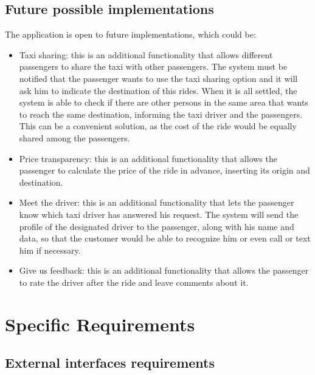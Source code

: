 \documentclass[18pt,oneside,a4paper, titlepage]{article}
\begin{document}
		\subsection{Future possible implementations}
			The application is open to future implementations, which could be:
			\begin{itemize}
				\item Taxi sharing: this is an additional functionality that allows different passengers to share the taxi with other passengers. The system must be notified that the passenger wants to use the taxi sharing option and it will ask him to indicate the destination of this rides. When it is all settled, the system is able to check if there are other persons in the same area that wants to reach the same destination, informing the taxi driver and the passengers. This can be a convenient solution, as the cost of the ride would be equally shared among the passengers.
				\item Price transparency: this is an additional functionality that allows the passenger to calculate the price of the ride in advance, inserting its origin and destination.
				\item Meet the driver: this is an additional functionality that lets the passenger know which taxi driver has answered his request. The system will send the profile of the designated driver to the passenger, along with his name and data, so that the customer would be able to recognize him or even call or text him if necessary.
				\item Give us feedback: this is an additional functionality that allows the passenger to rate the driver after the ride and leave comments about it.
			\end{itemize}

\newpage
\section{Specific Requirements}
	\subsection{External interfaces requirements}
\end{document}
